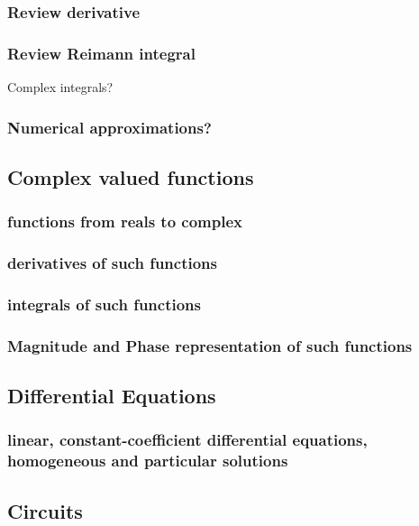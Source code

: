 \subsubsection*{Review derivative}

\subsubsection*{Review Reimann integral}

Complex integrals?

\subsubsection*{Numerical approximations?}

\subsection*{Complex valued functions}

\subsubsection*{functions from reals to complex}

\subsubsection*{derivatives of such functions}

\subsubsection*{integrals of such functions}

\subsubsection*{Magnitude and Phase representation of such functions}

\subsection*{Differential Equations}

\subsubsection*{linear, constant-coefficient differential equations, homogeneous and particular solutions}

\subsection*{Circuits}

